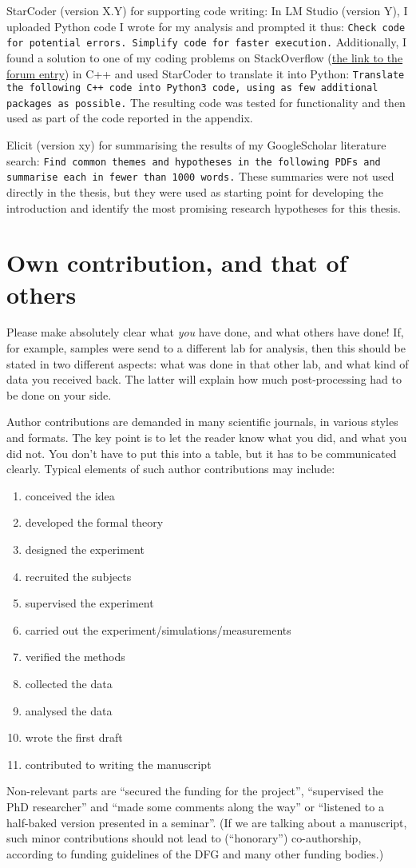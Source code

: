 StarCoder (version X.Y) for supporting code writing: In LM Studio (version Y), I uploaded Python code I wrote for my analysis and prompted it thus: \texttt{Check code for potential errors. Simplify code for faster execution.} Additionally, I found a solution to one of my coding problems on StackOverflow (\url{the link to the forum entry}) in C++ and used StarCoder to translate it into Python: \texttt{Translate the following C++ code into Python3 code, using as few additional packages as possible.} The resulting code was tested for functionality and then used as part of the code reported in the appendix.

Elicit (version xy) for summarising the results of my GoogleScholar literature search: \texttt{Find common themes and hypotheses in the following PDFs and summarise each in fewer than 1000 words.} These summaries were not used directly in the thesis, but they were used as starting point for developing the introduction and identify the most promising research hypotheses for this thesis.


 
\section{Own contribution, and that of others}
Please make absolutely clear what \emph{you} have done, and what others have done! If, for example, samples were send to a different lab for analysis, then this should be stated in two different aspects: what was done in that other lab, and what kind of data you received back. The latter will explain how much post-processing had to be done on your side.

Author contributions are demanded in many scientific journals, in various styles and formats. The key point is to let the reader know what you did, and what you did not. You don't have to put this into a table, but it has to be communicated clearly. Typical elements of such author contributions may include:
\begin{enumerate}
	\item conceived the idea
	\item developed the formal theory
	\item designed the experiment
	\item recruited the subjects
	\item supervised the experiment
	\item carried out the experiment/simulations/measurements
	\item verified the methods
	\item collected the data
	\item analysed the data
	\item wrote the first draft
	\item contributed to writing the manuscript
\end{enumerate}
Non-relevant parts are ``secured the funding for the project'', ``supervised the PhD researcher'' and ``made some comments along the way'' or ``listened to a half-baked version presented in a seminar''. (If we are talking about a manuscript, such minor contributions should not lead to (``honorary'') co-authorship, according to funding guidelines of the DFG and many other funding bodies.)